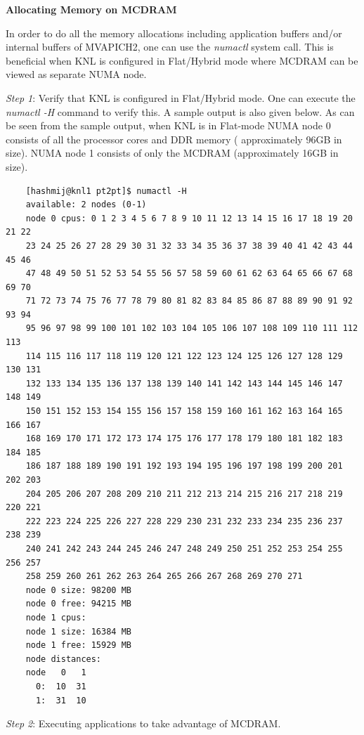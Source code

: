 \noindent \textbf{Allocating Memory on MCDRAM}

\noindent In order to do all the memory allocations including application
buffers and/or internal buffers of MVAPICH2, one can use the \textit{numactl}
system call. This is beneficial when KNL is configured in Flat/Hybrid mode where
MCDRAM can be viewed as separate NUMA node.

\noindent \textit{Step 1}: Verify that KNL is configured in Flat/Hybrid mode.
One can execute the \textit{numactl -H} command to verify this. A sample output
is also given below.
As can be seen from the sample output, when KNL is in Flat-mode NUMA node 0
consists of all the processor cores and DDR memory ( approximately 96GB in
size). NUMA node 1 consists of only the MCDRAM (approximately 16GB in size).


\begin{verbatim}
	[hashmij@knl1 pt2pt]$ numactl -H
	available: 2 nodes (0-1)
	node 0 cpus: 0 1 2 3 4 5 6 7 8 9 10 11 12 13 14 15 16 17 18 19 20 21 22
	23 24 25 26 27 28 29 30 31 32 33 34 35 36 37 38 39 40 41 42 43 44 45 46
	47 48 49 50 51 52 53 54 55 56 57 58 59 60 61 62 63 64 65 66 67 68 69 70
	71 72 73 74 75 76 77 78 79 80 81 82 83 84 85 86 87 88 89 90 91 92 93 94
	95 96 97 98 99 100 101 102 103 104 105 106 107 108 109 110 111 112 113
	114 115 116 117 118 119 120 121 122 123 124 125 126 127 128 129 130 131
	132 133 134 135 136 137 138 139 140 141 142 143 144 145 146 147 148 149
	150 151 152 153 154 155 156 157 158 159 160 161 162 163 164 165 166 167
	168 169 170 171 172 173 174 175 176 177 178 179 180 181 182 183 184 185
	186 187 188 189 190 191 192 193 194 195 196 197 198 199 200 201 202 203
	204 205 206 207 208 209 210 211 212 213 214 215 216 217 218 219 220 221
	222 223 224 225 226 227 228 229 230 231 232 233 234 235 236 237 238 239
	240 241 242 243 244 245 246 247 248 249 250 251 252 253 254 255 256 257
	258 259 260 261 262 263 264 265 266 267 268 269 270 271
	node 0 size: 98200 MB
	node 0 free: 94215 MB
	node 1 cpus:
	node 1 size: 16384 MB
	node 1 free: 15929 MB
	node distances:
	node   0   1
	  0:  10  31
	  1:  31  10 
\end{verbatim}
   
\noindent \textit{Step 2}: Executing applications to take advantage of MCDRAM.


